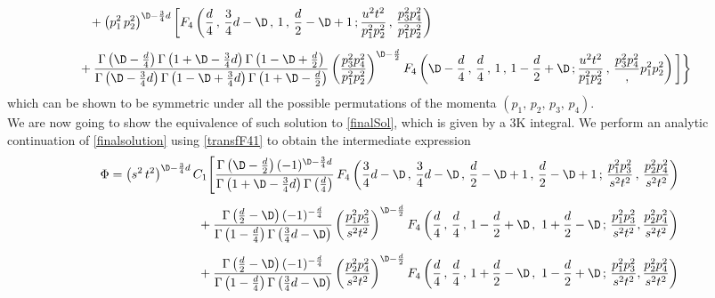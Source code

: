 \documentclass[a4paper,11pt,openright,twoside]{book}
\numberwithin{equation}{section}
\begin{document}
{\begin{equation}
	\begin{aligned}
		&+\left(p_1^2\,p_2^2\right)^{\D-\frac{3}{4}d}\bigg[F_4\left(\frac{d}{4}\,,\,\frac{3}{4}d-\D\, ,\,1\,,\,\frac{d}{2}-\D+1\,;\frac{u^2t^2}{p_1^2p_2^2}\,,\,\frac{p_3^2p_4^2}{p_1^2p_2^2}\right)\\[1.2ex]
		&\hspace{-0.3cm}+\frac{\Gamma\left(\D-\frac{d}{4}\right)\Gamma\left(1+\D-\frac{3}{4}d\right)\Gamma\left(1-\D+\frac{d}{2}\right)}{\Gamma\left(\D-\frac{3}{4}d\right)\Gamma\left(1-\D+\frac{3}{4}d\right)\Gamma\left(1+\D-\frac{d}{2}\right)}\left(\frac{p_3^2p_4^2}{p_1^2p_2^2}\right)^{\D-\frac{d}{2}} F_4\left(\D-\frac{d}{4}\,,\,\frac{d}{4}\, ,\,1\,,\,1-\frac{d}{2}+\D\,;\frac{u^2t^2}{p_1^2p_2^2}\,,\,\frac{p_3^2p_4^2},{p_1^2p_2^2}\right)\bigg]\bigg\}\label{finalsolution}
	\end{aligned}
\end{equation}
which can be shown to be symmetric under all the possible permutations of the momenta $(p_1,\,p_2,\,p_3,\,p_4)$.\\
We are now going to show the equivalence of such solution to \eqref{finalSol}, which is given by a 3K integral. We perform an analytic continuation of \eqref{finalsolution} using \eqref{transfF41} to obtain the intermediate expression
\begin{equation}
	\begin{aligned}
		\Phi&=\left(s^2\,t^2\right)^{\D-\frac{3}{4}d}C_1\Bigg[ \frac{\Gamma\left(\D-\frac{d}{2}\right)(-1)^{\D-\frac{3}{4}d}}{\Gamma\left(1+\D-\frac{3}{4}d\right)\Gamma\left(\frac{d}{4}\right)}\,F_4\left(\frac{3}{4}d-\D\,,\,\frac{3}{4}d-\D\, ,\,\frac{d}{2}-\D+1\,,\,\frac{d}{2}-\D+1\,;\,\frac{p_1^2p_3^2}{s^2t^2}\, ,\,\frac{p_2^2p_4^2}{s^2t^2}\right)\\[1.2ex]
		&\hspace{2.5cm}+\frac{\Gamma\left(\frac{d}{2}-\D\right)(-1)^{-\frac{d}{4}}}{\Gamma\left(1-\frac{d}{4}\right)\Gamma\left(\frac{3}{4}d-
			\D\right)}\left(\frac{p_1^2p_3^2}{s^2t^2}\right)^{\D-\frac{d}{2}} F_4\left(\frac{d}{4}\,,\,\frac{d}{4}\, ,\,1-\frac{d}{2}+\D\,,\,\,1+\frac{d}{2}-\D\,;\,\frac{p_1^2p_3^2}{s^2t^2},\frac{p_2^2p_4^2}{s^2t^2}\right)\\[1.2ex]
		&\hspace{2.5cm}+\frac{\Gamma\left(\frac{d}{2}-\D\right)(-1)^{-\frac{d}{4}}}{\Gamma\left(1-\frac{d}{4}\right)\Gamma\left(\frac{3}{4}d-
			\D\right)}\left(\frac{p_2^2p_4^2}{s^2t^2}\right)^{\D-\frac{d}{2}} F_4\left(\frac{d}{4}\,,\,\frac{d}{4}\, ,\,1+\frac{d}{2}-\D\,,\,\,1-\frac{d}{2}+\D\,;\,\frac{p_1^2p_3^2}{s^2t^2},\frac{p_2^2p_4^2}{s^2t^2}\right)\\[1.2ex]

\end{aligned}
\end{equation}}
\end{document}
